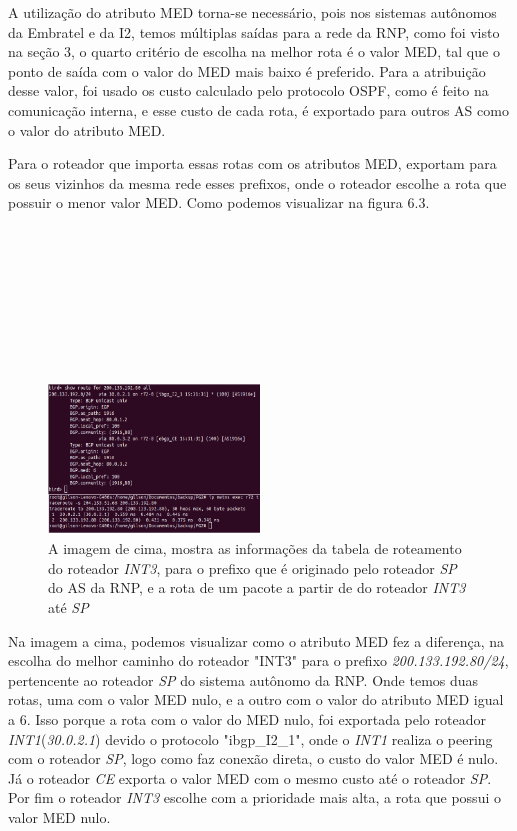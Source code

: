 \documentclass[12pt,a4paper]{report}
\begin{document}
A utiliza\c{c}\~ao do atributo MED torna-se necess\'ario, pois nos sistemas aut\^onomos da Embratel e da I2, temos m\'ultiplas sa\'idas para a rede da RNP, como foi visto na se\c{c}\~ao 3, o quarto crit\'erio de escolha na melhor rota \'e o valor MED, tal que o ponto de sa\'ida com o valor do MED mais baixo \'e preferido. Para a atribui\c{c}\~ao desse valor, foi usado os custo calculado pelo protocolo OSPF, como \'e feito na comunica\c{c}\~ao interna, e esse custo de cada rota, \'e exportado para outros AS como o valor do atributo MED.

Para o roteador que importa essas rotas com os atributos MED, exportam para os seus vizinhos da mesma rede esses prefixos, onde o roteador escolhe a rota que possuir o menor valor MED. Como podemos visualizar na figura 6.3.
\\
\\
\\
\\
\\
\\
\\
\\
\\
\begin{figure}[!htb]
 \centering
 \includegraphics[width=0.5\textwidth]{Imagens/figura63}
  \caption{\label{fig:imagem10} A imagem de cima, mostra as informa\c{c}\~oes da tabela de roteamento do roteador \textit{INT3}, para o prefixo que \'e originado pelo roteador \textit{SP} do AS da RNP, e a rota de um pacote a partir de do roteador \textit{INT3} at\'e \textit{SP}}
\end{figure}

Na imagem a cima, podemos visualizar como o atributo MED fez a diferen\c{c}a, na escolha do melhor caminho do roteador "INT3" para o prefixo \textit{200.133.192.80/24}, pertencente ao roteador \textit{SP} do sistema aut\^onomo da RNP. Onde temos duas rotas, uma com o valor MED nulo, e a outro com o valor do atributo MED igual a 6. Isso porque a rota com o valor do MED nulo, foi exportada pelo roteador \textit{INT1}(\textit{30.0.2.1}) devido o protocolo "ibgp\_I2\_1", onde o \textit{INT1} realiza o peering com o roteador \textit{SP}, logo como faz conex\~ao direta, o custo do valor MED \'e nulo. J\'a o roteador \textit{CE} exporta o valor MED com o mesmo custo at\'e o roteador \textit{SP}. Por fim o roteador \textit{INT3} escolhe com a prioridade mais alta, a rota que possui o valor MED nulo.
\end{document}
